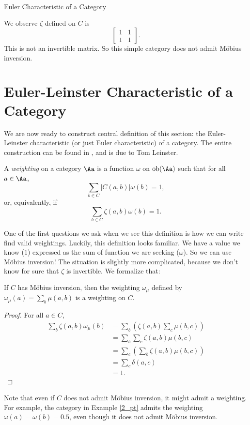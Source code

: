 \documentclass[12pt]{pom_thesis}
\DeclareMathOperator{\obj}{ob}
\begin{document}
\begin{chapter}{Euler Characteristic of a Category}
\begin{examp}
We observe $\zeta$ defined on $C$ is
\[\begin{bmatrix}1 & 1 \\ 1 & 1 \end{bmatrix}.\]
This is not an invertible matrix. So this simple category does not admit M\"obius inversion.
\end{examp} 

\section{Euler-Leinster Characteristic of a Category}
We are now ready to construct central definition of this section: the Euler-Leinster characteristic (or just Euler characteristic) of a category. The entire construction can be found in \cite{Lein1, Lein2, Lein4}, and is due to Tom Leinster.

\begin{defn}\label{def_weighting}
A \emph{weighting} on a category $\Aa$ is a function $\omega$ on $\obj(\Aa)$ such that for all $a \in \Aa$,
\[
\sum_{b \in C}|C(a,b)|\omega(b) = 1,
\]
or, equivalently, if
\[
\sum_{b \in C}\zeta(a,b)\omega(b) = 1.
\]
\end{defn}

One of the first questions we ask when we see this definition is how we can write find valid weightings. Luckily, this definition looks familiar. We have a value we know (1) expressed as the sum of function we are seeking ($\omega$). So we can use M\"obius inversion! The situation is slightly more complicated, because we don't know for sure that $\zeta$ is invertible. We formalize that:

\begin{lemma}
\label{mobius_is_weighting}
If $C$ has M\"obius inversion, then the weighting $\omega_\mu$ defined by $\omega_\mu(a) = \sum_b \mu(a,b)$ is a weighting on $C$.
\end{lemma}
\begin{proof} For all $a \in C$,
\begin{align*}
\sum_b \zeta(a,b)\omega_\mu(b) &= \sum_b\left( \zeta(a,b)\sum_c \mu(b,c)\right)\\
&=\sum_b\sum_c\zeta(a,b)\mu(b,c)\\
&=\sum_c\left(\sum_b\zeta(a,b)\mu(b,c)\right)\\
&=\sum_c \delta(a,c)\\
&=1.
\end{align*}
\end{proof}

Note that even if $C$ does not admit M\"obius inversion, it might admit a weighting. For example, the category in Example \ref{2_pt} admits the weighting $\omega(a) = \omega(b) = 0.5$, even though it does not admit M\"obius inversion.


\end{chapter}
\end{document}

